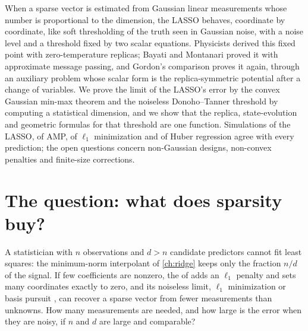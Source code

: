 \begin{refsection}

\begin{chaptersummary}
When a sparse vector is estimated from Gaussian linear measurements whose number is proportional to the dimension, the LASSO behaves, coordinate by coordinate, like soft thresholding of the truth seen in Gaussian noise, with a noise level and a threshold fixed by two scalar equations. Physicists derived this fixed point with zero-temperature replicas; Bayati and Montanari proved it with approximate message passing, and Gordon's comparison proves it again, through an auxiliary problem whose scalar form is the replica-symmetric potential after a change of variables. We prove the limit of the LASSO's error by the convex Gaussian min-max theorem and the noiseless Donoho--Tanner threshold by computing a statistical dimension, and we show that the replica, state-evolution and geometric formulas for that threshold are one function. Simulations of the LASSO, of AMP, of $\ell_1$ minimization and of Huber regression agree with every prediction; the open questions concern non-Gaussian designs, non-convex penalties and finite-size corrections.
\end{chaptersummary}

\section{The question: what does sparsity buy?}\label{sec:lasso:question}

A statistician with $n$ observations and $d>n$ candidate predictors cannot fit least squares: the minimum-norm interpolant of \cref{ch:ridge} keeps only the fraction $n/d$ of the signal. If few coefficients are nonzero, the  of \textcite{Tibshirani1996} adds an $\ell_1$ penalty and sets many coordinates exactly to zero, and its noiseless limit, $\ell_1$ minimization or basis pursuit \parencite{ChenDonohoSaunders1998}, can recover a sparse vector from fewer measurements than unknowns. How many measurements are needed, and how large is the error when they are noisy, if $n$ and $d$ are large and comparable?


\end{refsection}
